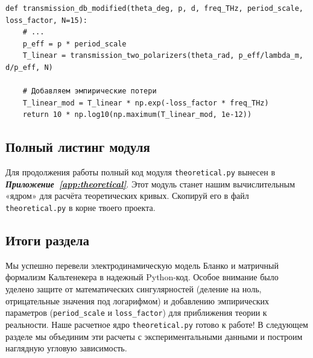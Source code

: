 \begin{verbatim}
def transmission_db_modified(theta_deg, p, d, freq_THz, period_scale, loss_factor, N=15):
    # ...
    p_eff = p * period_scale
    T_linear = transmission_two_polarizers(theta_rad, p_eff/lambda_m, d/p_eff, N)
    
    # Добавляем эмпирические потери
    T_linear_mod = T_linear * np.exp(-loss_factor * freq_THz)
    return 10 * np.log10(np.maximum(T_linear_mod, 1e-12))
\end{verbatim}

\subsection{Полный листинг модуля}

Для продолжения работы полный код модуля \texttt{theoretical.py} вынесен в \textbf{\textit{Приложение~\ref{app:theoretical}}}. Этот модуль станет нашим вычислительным «ядром» для расчёта теоретических кривых. Скопируй его в файл \texttt{theoretical.py} в корне твоего проекта.

\subsection{Итоги раздела}
Мы успешно перевели электродинамическую модель Бланко и матричный формализм Кальтенекера в надежный Python-код. Особое внимание было уделено защите от математических сингулярностей (деление на ноль, отрицательные значения под логарифмом) и добавлению эмпирических параметров (\texttt{period\_scale} и \texttt{loss\_factor}) для приближения теории к реальности. Наше расчетное ядро \texttt{theoretical.py} готово к работе! В следующем разделе мы объединим эти расчеты с экспериментальными данными и построим наглядную угловую зависимость.